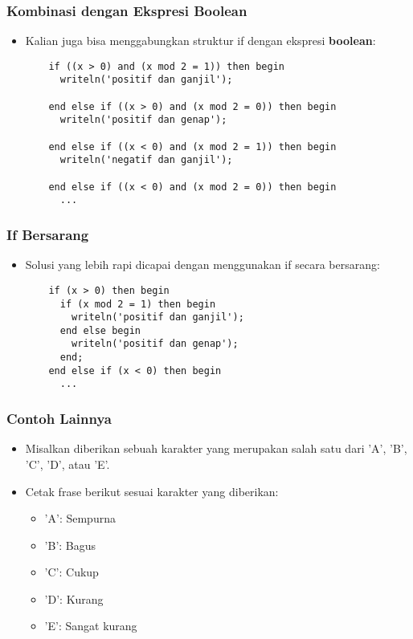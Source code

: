 \documentclass{beamer}
\begin{document}
\begin{frame}[fragile]
\frametitle{Kombinasi dengan Ekspresi Boolean}
\begin{itemize}
  \item Kalian juga bisa menggabungkan struktur if dengan ekspresi \textbf{boolean}:
  \begin{lstlisting}
    if ((x > 0) and (x mod 2 = 1)) then begin
      writeln('positif dan ganjil');

    end else if ((x > 0) and (x mod 2 = 0)) then begin
      writeln('positif dan genap');

    end else if ((x < 0) and (x mod 2 = 1)) then begin
      writeln('negatif dan ganjil');

    end else if ((x < 0) and (x mod 2 = 0)) then begin
      ...
  \end{lstlisting}
\end{itemize}
\end{frame}

\begin{frame}[fragile]
\frametitle{If Bersarang}
\begin{itemize}
  \item Solusi yang lebih rapi dicapai dengan menggunakan if secara bersarang:
  \begin{lstlisting}
    if (x > 0) then begin
      if (x mod 2 = 1) then begin
        writeln('positif dan ganjil');
      end else begin
        writeln('positif dan genap');
      end;
    end else if (x < 0) then begin
      ...
  \end{lstlisting}
\end{itemize}
\end{frame}

\begin{frame}
\frametitle{Contoh Lainnya}
\begin{itemize}
  \item Misalkan diberikan sebuah karakter yang merupakan salah satu dari 'A', 'B', 'C', 'D', atau 'E'.
  \item Cetak frase berikut sesuai karakter yang diberikan:
  \begin{itemize}
    \item 'A': Sempurna
    \item 'B': Bagus
    \item 'C': Cukup
    \item 'D': Kurang
    \item 'E': Sangat kurang
  \end{itemize}
\end{itemize}
\end{frame}
\end{document}
